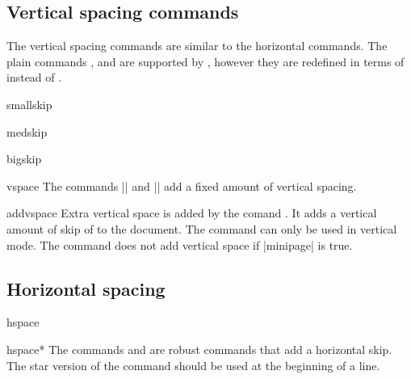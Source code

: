 %
%

\subsection{Vertical spacing commands}

The vertical spacing commands are similar to the horizontal commands. The plain \tex commands ,  and  are
supported by \latex, however they are redefined in terms of  instead
of .
\begin{docCommand*}{smallskip}{}
\end{docCommand*}
\begin{docCommand*}{medskip}{}
\end{docCommand*}
\begin{docCommand*}{bigskip}{}
\end{docCommand*}
 


\begin{docCommand}{vspace}{\meta{*}}
The commands |\vspace| and |\vspace*| add a fixed amount of vertical
spacing.
\end{docCommand}


\begin{docCommand*}{addvspace}{}
Extra vertical space is added by the comand . It adds
a vertical amount of skip of  to the document. The command can only be
used in vertical mode. The  command does not add vertical
space if |minipage| is true.
\end{docCommand*}

\subsection{Horizontal spacing}

\begin{docCommand}{hspace}{}
\begin{docCommand}{hspace*}{}
The commands  and  are robust
commands that add a horizontal
skip. The star version of the command should be used at the beginning of a line.
\end{docCommand}
\end{docCommand}

